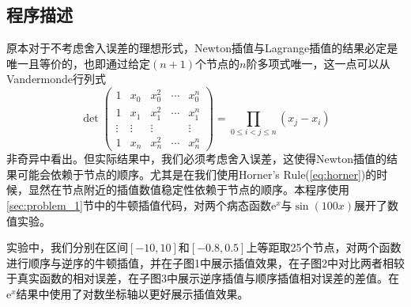 \begin{center}
\end{center}

\subsection{程序描述}
原本对于不考虑舍入误差的理想形式，Newton插值与Lagrange插值的结果必定是唯一且等价的，也即通过给定$(n+1)$个节点的$n$阶多项式唯一，这一点可以从Vandermonde行列式
\[
\det \begin{pmatrix}
1 & x_0 & x_0^2 & \cdots & x_0^n \\
1 & x_1 & x_1^2 & \cdots & x_1^n \\
\vdots & \vdots & \vdots & & \vdots \\
1 & x_n & x_n^2 & \cdots & x_n^n
\end{pmatrix} = \prod_{0 \leq i < j \leq n} (x_j - x_i)
\]
非奇异中看出。但实际结果中，我们必须考虑舍入误差，这使得Newton插值的结果可能会依赖于节点的顺序。尤其是在我们使用Horner's Rule(\ref{eq:horner})的时候，显然在节点附近的插值数值稳定性依赖于节点的顺序。本程序使用\ref{sec:problem_1}节中的牛顿插值代码，对两个病态函数\(\mathrm{e}^x\)与\(\sin(100x)\)展开了数值实验。

实验中，我们分别在区间\([-10, 10]\)和\([-0.8, 0.5]\)上等距取25个节点，对两个函数进行顺序与逆序的牛顿插值，并在子图1中展示插值效果，在子图2中对比两者相较于真实函数的相对误差，在子图3中展示逆序插值与顺序插值相对误差的差值。在\(\mathrm{e}^x\)结果中使用了对数坐标轴以更好展示插值效果。
